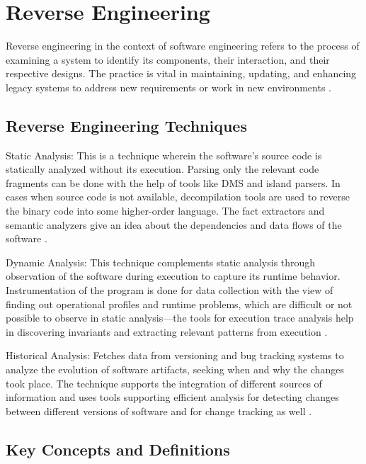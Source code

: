 \section{Reverse Engineering}

Reverse engineering in the context of software engineering refers to the process of examining a system to identify its components, their interaction, and their respective designs. The practice is vital in maintaining, updating, and enhancing legacy systems to address new requirements or work in new environments \cite{ReverseEngineering2011}.

\subsection{Reverse Engineering Techniques}

Static Analysis: This is a technique wherein the software's source code is statically analyzed without its execution. Parsing only the relevant code fragments can be done with the help of tools like DMS and island parsers. In cases when source code is not available, decompilation tools are used to reverse the binary code into some higher-order language. The fact extractors and semantic analyzers give an idea about the dependencies and data flows of the software \cite{ReverseEngineering1990}.

Dynamic Analysis: This technique complements static analysis through observation of the software during execution to capture its runtime behavior. Instrumentation of the program is done for data collection with the view of finding out operational profiles and runtime problems, which are difficult or not possible to observe in static analysis—the tools for execution trace analysis help in discovering invariants and extracting relevant patterns from execution \cite{ReverseEngineering1990} \cite{ReverseEngineering2011}.

Historical Analysis: Fetches data from versioning and bug tracking systems to analyze the evolution of software artifacts, seeking when and why the changes took place. The technique supports the integration of different sources of information and uses tools supporting efficient analysis for detecting changes between different versions of software and for change tracking as well \cite{ReverseEngineering1990}.

\subsection{Key Concepts and Definitions}

